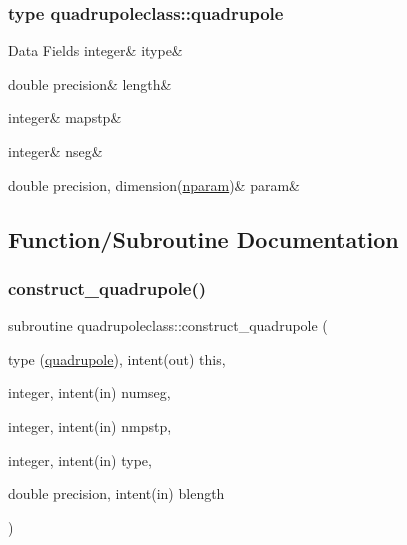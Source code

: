 \subsubsection{type quadrupoleclass\+::quadrupole}
\begin{DoxyFields}{Data Fields}
\mbox{\label{namespacequadrupoleclass_addaf50b0cff1aec9fc452925c7819bdb}} 
integer&
itype&
\\
\hline

\mbox{\label{namespacequadrupoleclass_ac84e0debf991be5cd71ee964781dd7af}} 
double precision&
length&
\\
\hline

\mbox{\label{namespacequadrupoleclass_a283a967adb1fb9dd7c742b5ce97ef3a0}} 
integer&
mapstp&
\\
\hline

\mbox{\label{namespacequadrupoleclass_afece7d333f73554720932318f413f11b}} 
integer&
nseg&
\\
\hline

\mbox{\label{namespacequadrupoleclass_ab9bcd11b6a6e1b6d7242eb243029393f}} 
double precision, dimension(\mbox{\hyperlink{namespacequadrupoleclass_a8eba81bd9796e431c21d0f46260b0c6c}{nparam}})&
param&
\\
\hline

\end{DoxyFields}


\subsection{Function/\+Subroutine Documentation}
\mbox{\label{namespacequadrupoleclass_afebabbf596b8330dcdbc2741bb939b5c}} 
\subsubsection{\texorpdfstring{construct\_quadrupole()}{construct\_quadrupole()}}
{\footnotesize\ttfamily subroutine quadrupoleclass\+::construct\+\_\+quadrupole (\begin{DoxyParamCaption}\item[{type (\mbox{\hyperlink{namespacequadrupoleclass_structquadrupoleclass_1_1quadrupole}{quadrupole}}), intent(out)}]{this,  }\item[{integer, intent(in)}]{numseg,  }\item[{integer, intent(in)}]{nmpstp,  }\item[{integer, intent(in)}]{type,  }\item[{double precision, intent(in)}]{blength }\end{DoxyParamCaption})}

